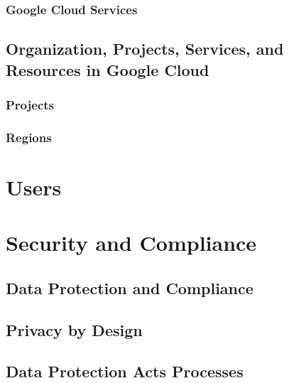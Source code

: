 \documentclass[12pt]{article}
\begin{document}
    \subsubsection{Google Cloud Services}

    \subsection{Organization, Projects, Services, and Resources in Google Cloud}

    \subsubsection{Projects}

    \subsubsection{Regions}


    \section{Users}


    \section{Security and Compliance}

    \subsection{Data Protection and Compliance}

    \subsection{Privacy by Design}

    \subsection{Data Protection Acts Processes}

\end{document}
